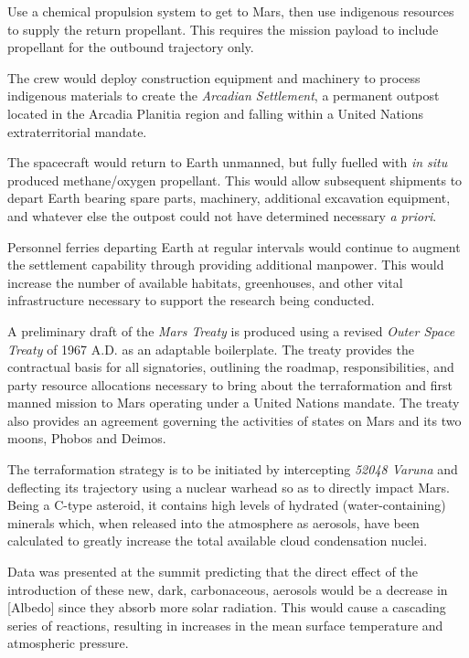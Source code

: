 \item Use a chemical propulsion system to get to Mars, then use indigenous resources to supply the return propellant. This requires the mission payload to include propellant for the outbound trajectory only.

\item The crew would deploy construction equipment and machinery to process indigenous materials to create the {\it Arcadian Settlement}, a permanent outpost located in the Arcadia Planitia region and falling within a United Nations extraterritorial mandate.

\item The spacecraft would return to Earth unmanned, but fully fuelled with {\it in situ} produced methane/oxygen propellant. This would allow subsequent shipments to depart Earth bearing spare parts, machinery, additional excavation equipment, and whatever else the outpost could not have determined necessary {\it a priori}.

\item Personnel ferries departing Earth at regular intervals would continue to augment the settlement capability through providing additional manpower. This would increase the number of available habitats, greenhouses, and other vital infrastructure necessary to support the research being conducted.
\stopitemize

A preliminary draft of the {\it Mars Treaty} is produced using a revised {\it Outer Space Treaty} of 1967 A.D. as an adaptable boilerplate. The treaty provides the contractual basis for all signatories, outlining the roadmap, responsibilities, and party resource allocations necessary to bring about the terraformation and first manned mission to Mars operating under a United Nations mandate. The treaty also provides an agreement governing the activities of states on Mars and its two moons, Phobos and Deimos.

The terraformation strategy is to be initiated by intercepting {\it 52048 Varuna} and deflecting its trajectory using a nuclear warhead so as to directly impact Mars. Being a C-type asteroid, it contains high levels of hydrated (water-containing) minerals which, when released into the atmosphere as aerosols, have been calculated to greatly increase the total available cloud condensation nuclei.

Data was presented at the summit predicting that the direct effect of the introduction of these new, dark, carbonaceous, aerosols would be a decrease in [Albedo] since they absorb more solar radiation. This would cause a cascading series of reactions, resulting in increases in the mean surface temperature and atmospheric pressure.

